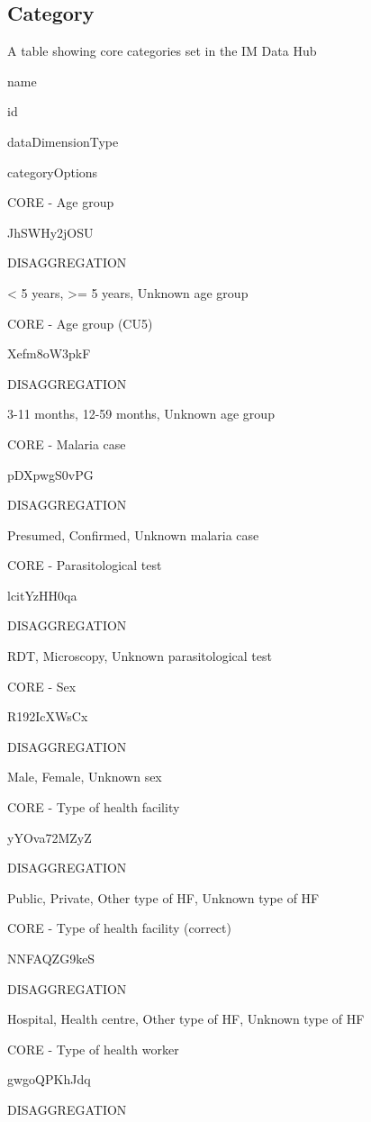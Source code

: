 \documentclass[]{book}
\begin{document}
\hypertarget{category}{%
\subsection{Category}\label{category}}

\label{tab:unnamed-chunk-14}A table showing core categories set in the IM Data Hub

name

id

dataDimensionType

categoryOptions

CORE - Age group

JhSWHy2jOSU

DISAGGREGATION

\textless{} 5 years, \textgreater{}= 5 years, Unknown age group

CORE - Age group (CU5)

Xefm8oW3pkF

DISAGGREGATION

3-11 months, 12-59 months, Unknown age group

CORE - Malaria case

pDXpwgS0vPG

DISAGGREGATION

Presumed, Confirmed, Unknown malaria case

CORE - Parasitological test

lcitYzHH0qa

DISAGGREGATION

RDT, Microscopy, Unknown parasitological test

CORE - Sex

R192IcXWsCx

DISAGGREGATION

Male, Female, Unknown sex

CORE - Type of health facility

yYOva72MZyZ

DISAGGREGATION

Public, Private, Other type of HF, Unknown type of HF

CORE - Type of health facility (correct)

NNFAQZG9keS

DISAGGREGATION

Hospital, Health centre, Other type of HF, Unknown type of HF

CORE - Type of health worker

gwgoQPKhJdq

DISAGGREGATION
\end{document}

